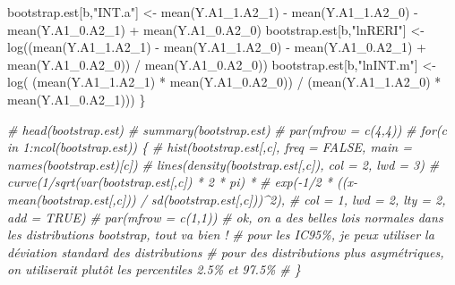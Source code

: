 \documentclass[
]{book}
\newenvironment{Shaded}{\begin{snugshade}}{\end{snugshade}}
\newcommand{\CommentTok}[1]{\textcolor[rgb]{0.56,0.35,0.01}{\textit{#1}}}
\newcommand{\FunctionTok}[1]{\textcolor[rgb]{0.00,0.00,0.00}{#1}}
\newcommand{\NormalTok}[1]{#1}
\newcommand{\OtherTok}[1]{\textcolor[rgb]{0.56,0.35,0.01}{#1}}
\newcommand{\SpecialCharTok}[1]{\textcolor[rgb]{0.00,0.00,0.00}{#1}}
\newcommand{\StringTok}[1]{\textcolor[rgb]{0.31,0.60,0.02}{#1}}
\begin{document}
\begin{Shaded}
\begin{Highlighting}[]
\NormalTok{      bootstrap.est[b,}\StringTok{"INT.a"}\NormalTok{] }\OtherTok{\textless{}{-}} \FunctionTok{mean}\NormalTok{(Y.A1\_1.A2\_1) }\SpecialCharTok{{-}}
        \FunctionTok{mean}\NormalTok{(Y.A1\_1.A2\_0) }\SpecialCharTok{{-}} \FunctionTok{mean}\NormalTok{(Y.A1\_0.A2\_1) }\SpecialCharTok{+} \FunctionTok{mean}\NormalTok{(Y.A1\_0.A2\_0)}
\NormalTok{      bootstrap.est[b,}\StringTok{"lnRERI"}\NormalTok{] }\OtherTok{\textless{}{-}} \FunctionTok{log}\NormalTok{((}\FunctionTok{mean}\NormalTok{(Y.A1\_1.A2\_1) }\SpecialCharTok{{-}}
        \FunctionTok{mean}\NormalTok{(Y.A1\_1.A2\_0) }\SpecialCharTok{{-}} \FunctionTok{mean}\NormalTok{(Y.A1\_0.A2\_1) }\SpecialCharTok{+} \FunctionTok{mean}\NormalTok{(Y.A1\_0.A2\_0)) }\SpecialCharTok{/} \FunctionTok{mean}\NormalTok{(Y.A1\_0.A2\_0))}
\NormalTok{      bootstrap.est[b,}\StringTok{"lnINT.m"}\NormalTok{] }\OtherTok{\textless{}{-}} \FunctionTok{log}\NormalTok{( (}\FunctionTok{mean}\NormalTok{(Y.A1\_1.A2\_1) }\SpecialCharTok{*}
        \FunctionTok{mean}\NormalTok{(Y.A1\_0.A2\_0)) }\SpecialCharTok{/}\NormalTok{ (}\FunctionTok{mean}\NormalTok{(Y.A1\_1.A2\_0) }\SpecialCharTok{*} \FunctionTok{mean}\NormalTok{(Y.A1\_0.A2\_1)))}
\NormalTok{    \}}

    \CommentTok{\# head(bootstrap.est)}
    \CommentTok{\# summary(bootstrap.est)}
    \CommentTok{\# par(mfrow = c(4,4))}
    \CommentTok{\# for(c in 1:ncol(bootstrap.est)) \{}
    \CommentTok{\#   hist(bootstrap.est[,c], freq = FALSE, main = names(bootstrap.est)[c])}
    \CommentTok{\#   lines(density(bootstrap.est[,c]), col = 2, lwd = 3)}
    \CommentTok{\#   curve(1/sqrt(var(bootstrap.est[,c]) * 2 * pi) *}
    \CommentTok{\#           exp({-}1/2 * ((x{-}mean(bootstrap.est[,c])) / sd(bootstrap.est[,c]))\^{}2),}
    \CommentTok{\#         col = 1, lwd = 2, lty = 2, add = TRUE)}
    \CommentTok{\# par(mfrow = c(1,1))}
    \CommentTok{\# ok, on a des belles lois normales dans les distributions bootstrap, tout va bien !}
    \CommentTok{\# pour les IC95\%, je peux utiliser la déviation standard des distributions}
    \CommentTok{\# pour des distributions plus asymétriques, on utiliserait plutôt les percentiles 2.5\% et 97.5\%}
    \CommentTok{\# \}}


\end{Highlighting}
\end{Shaded}
\end{document}
